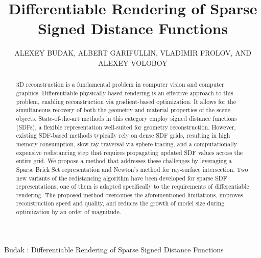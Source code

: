 \documentclass{ieeeaccess}
\begin{document}

\title{Differentiable Rendering of Sparse Signed Distance Functions}
\author{\uppercase{Alexey Budak}, 
\uppercase{Albert Garifullin}, 
\uppercase{Vladimir Frolov}, AND
\uppercase{Alexey Voloboy}}

\address[1]{Institute for Artificial Intelligence of Lomonosov Moscow State University (IAI MSU), 119192 Moscow, Russia}
\address[2]{Lomonosov Moscow State University, 119991 Moscow, Russia}


{Budak \headeretal: Differentiable Rendering of Sparse Signed Distance Functions}


\begin{abstract}
3D reconstruction is a fundamental problem in computer vision and computer graphics. Differentiable physically based rendering is an effective approach to this problem, enabling reconstruction via gradient-based optimization. It allows for the simultaneous recovery of both the geometry and material properties of the scene objects. State-of-the-art methods in this category employ signed distance functions (SDFs), a flexible representation well-suited for geometry reconstruction. However, existing SDF-based methods typically rely on dense SDF grids, resulting in high memory consumption, slow ray traversal via sphere tracing, and a computationally expensive redistancing step that requires propagating updated SDF values across the entire grid. We propose a method that addresses these challenges by leveraging a Sparse Brick Set representation and Newton's method for ray-surface intersection. Two new variants of the redistancing algorithm have been developed for sparse SDF representations; one of them is adapted specifically to the requirements of differentiable rendering. The proposed method overcomes the aforementioned limitations, improves reconstruction speed and quality, and reduces the growth of model size during optimization by an order of magnitude.
\end{abstract}
\end{document}

